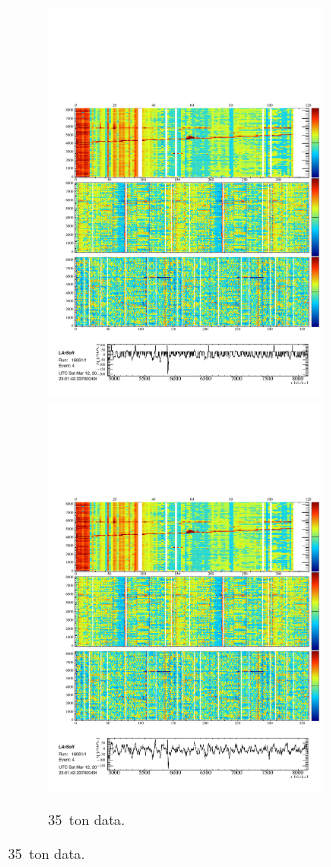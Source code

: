 \begin{figure}
\begin{subfigure}[t]{\linewidth}
\begin{minipage}{0.48\textwidth}
      \includegraphics[width=0.8\textwidth]{DataMuonU1.pdf}
      \includegraphics[width=0.8\textwidth]{DataMuonU2.pdf}
    \end{minipage}
    \caption{35~ton data.}
    \label{fig:DataMuon}
  \end{subfigure}


\end{figure}

